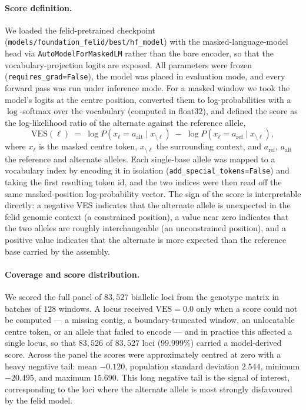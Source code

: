 \documentclass[twocolumn,10pt]{article}
\begin{document}
\paragraph{Score definition.} We loaded the felid-pretrained checkpoint
(\texttt{models/foundation\_felid/best/hf\_model}) with the masked-language-model head via
\texttt{AutoModelForMaskedLM} rather than the bare encoder, so that the vocabulary-projection logits
are exposed. All parameters were frozen (\texttt{requires\_grad=False}), the model was placed in
evaluation mode, and every forward pass was run under inference mode. For a masked window we took
the model's logits at the centre position, converted them to log-probabilities with a $\log$-softmax
over the vocabulary (computed in float32), and defined the score as the log-likelihood ratio of the
alternate against the reference allele,
\begin{equation}
\mathrm{VES}(\ell) \;=\; \log P\!\left(x_\ell = a_{\text{alt}} \mid x_{\setminus \ell}\right) \;-\; \log P\!\left(x_\ell = a_{\text{ref}} \mid x_{\setminus \ell}\right),
\end{equation}
where $x_\ell$ is the masked centre token, $x_{\setminus \ell}$ the surrounding context, and
$a_{\text{ref}}$, $a_{\text{alt}}$ the reference and alternate alleles. Each single-base allele was
mapped to a vocabulary index by encoding it in isolation (\texttt{add\_special\_tokens=False}) and
taking the first resulting token id, and the two indices were then read off the same masked-position
log-probability vector. The sign of the score is interpretable directly: a negative VES indicates
that the alternate allele is unexpected in the felid genomic context (a constrained position), a
value near zero indicates that the two alleles are roughly interchangeable (an unconstrained
position), and a positive value indicates that the alternate is more expected than the reference
base carried by the assembly.

\paragraph{Coverage and score distribution.} We scored the full panel of $83{,}527$ biallelic loci
from the genotype matrix in batches of $128$ windows. A locus received $\mathrm{VES}=0.0$ only when
a score could not be computed --- a missing contig, a boundary-truncated window, an unlocatable
centre token, or an allele that failed to encode --- and in practice this affected a single locus,
so that $83{,}526$ of $83{,}527$ loci ($99.999\%$) carried a model-derived score. Across the panel
the scores were approximately centred at zero with a heavy negative tail: mean $-0.120$, population
standard deviation $2.544$, minimum $-20.495$, and maximum $15.690$. This long negative tail is the
signal of interest, corresponding to the loci where the alternate allele is most strongly
disfavoured by the felid model.
\end{document}
